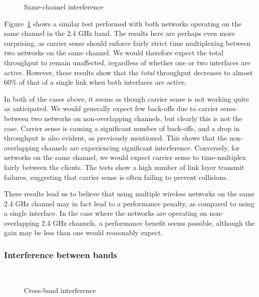 \begin{figure}[h]
 \centering
 
 \caption{Same-channel interference}\label{graph:sc-interference}
\end{figure}

Figure~\ref{graph:sc-interference} shows a similar test performed with both
networks operating on the same channel in the 2.4 GHz band. The results here are
perhaps even more surprising, as carrier sense should enforce fairly strict
time multiplexing between two networks on the same channel. We would therefore
expect the total throughput to remain unaffected, regardless of
whether one or two interfaces are active. However, these results show that the
\emph{total} throughput decreases to almost 60\% of that of a single link when
both interfaces are active.

In both of the cases above, it seems as though carrier sense is not working quite
as anticipated. We would generally expect few back-offs due to carrier sense between
two networks on non-overlapping channels, but clearly this is not the case. Carrier sense is causing a significant number of back-offs, and a drop in throughput is also evident, as previously mentioned. This shows that the non-overlapping channels are experiencing significant interference.
Conversely, for networks on the same channel, we would expect carrier sense to
time-multiplex fairly between the clients. The tests show a high number of 
link layer transmit failures, suggesting that carrier sense is often failing 
to prevent collisions.

These results lead us to believe that using multiple wireless networks on the same 2.4 GHz channel may in fact lead to a performance penalty, as compared to using a
single interface. In the case where the networks are operating on non-overlapping 2.4
GHz channels, a performance benefit seems possible, although the gain may be less
than one would reasonably expect.


\subsubsection{Interference between bands}

\begin{figure}[h]
 \centering
 \subfloat[][uplink] {\
   \label{graph:cb-interference-up}
 }
 \\
 \subfloat[][downlink] {\
   \label{graph:cb-interference-down}
 }
 \caption{Cross-band interference}
\end{figure}

